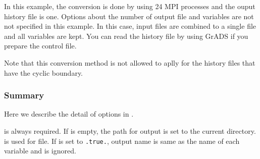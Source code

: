 In this example, the conversion is done by using 24 MPI processes and the ouput history file is one.
Options about the number of output file and variables are not not specified in this example. In this case, input files are combined to a single file and all variables are kept.
You can read the history file by using GrADS if you prepare the control file.

Note that this conversion method is not allowed to aplly for the history files that have the cyclic boundary.

\subsubsection{Summary}

Here we describe the detail of options in .


 is always required. If  is empty, the path for output is set to the current directory.
 is used for \scalenetcdf file. If  is set to \verb|.true.|, output name is same as the name of each variable and  is ignored.

